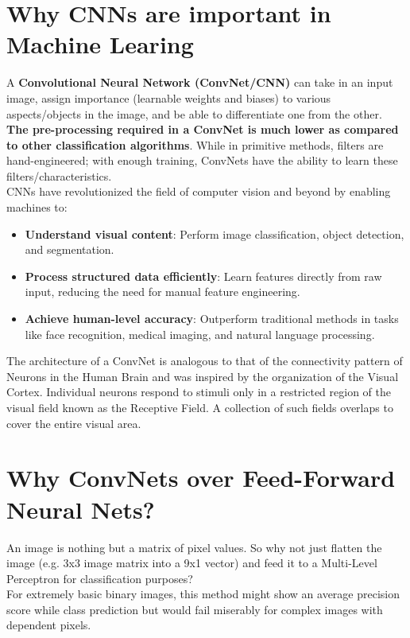 \section{Why CNNs are important in Machine Learing}
A \textbf{Convolutional Neural Network (ConvNet/CNN)} can take in an input image, assign importance (learnable weights and biases) to various aspects/objects in the image, and be able to differentiate one from the other. \textbf{The pre-processing required in a ConvNet is much lower as compared to other classification algorithms}. While in primitive methods, filters are hand-engineered; with enough training, ConvNets have the ability to learn these filters/characteristics.\\

CNNs have revolutionized the field of computer vision and beyond by enabling machines to:
\begin{itemize}
    \item \textbf{Understand visual content}: Perform image classification, object detection, and segmentation.
    \item \textbf{Process structured data efficiently}: Learn features directly from raw input, reducing the need for manual feature engineering.
    \item \textbf{Achieve human-level accuracy}: Outperform traditional methods in tasks like face recognition, medical imaging, and natural language processing.
\end{itemize}

The architecture of a ConvNet is analogous to that of the connectivity pattern of Neurons in the Human Brain and was inspired by the organization of the Visual Cortex. Individual neurons respond to stimuli only in a restricted region of the visual field known as the Receptive Field. A collection of such fields overlaps to cover the entire visual area.

\section{Why ConvNets over Feed-Forward Neural Nets?}
An image is nothing but a matrix of pixel values. So why not just flatten the image (e.g. 3x3 image matrix into a 9x1 vector) and feed it to a Multi-Level Perceptron for classification purposes?\\

For extremely basic binary images, this method might show an average precision score while class prediction but would fail miserably for complex images with dependent pixels.

